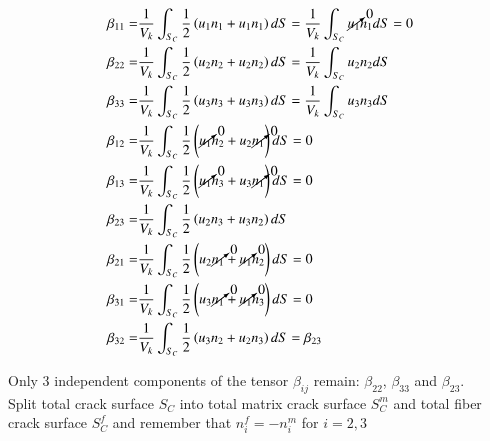 \documentclass[review]{elsarticle}
\begin{document}
\begin{equation}
\begin{aligned}
\beta_{11}=&\frac{1}{V_{k}}\int_{S_{C}}\frac{1}{2}\left(u_{1}n_{1}+u_{1}n_{1}\right)dS=\frac{1}{V_{k}}\int_{S_{C}}\cancelto{0}{u_{1}}n_{1}dS=0\\
\beta_{22}=&\frac{1}{V_{k}}\int_{S_{C}}\frac{1}{2}\left(u_{2}n_{2}+u_{2}n_{2}\right)dS=\frac{1}{V_{k}}\int_{S_{C}}u_{2}n_{2}dS\\
\beta_{33}=&\frac{1}{V_{k}}\int_{S_{C}}\frac{1}{2}\left(u_{3}n_{3}+u_{3}n_{3}\right)dS=\frac{1}{V_{k}}\int_{S_{C}}u_{3}n_{3}dS\\
\beta_{12}=&\frac{1}{V_{k}}\int_{S_{C}}\frac{1}{2}\left(\cancelto{0}{u_{1}}n_{2}+u_{2}\cancelto{0}{n_{1}}\right)dS=0\\
\beta_{13}=&\frac{1}{V_{k}}\int_{S_{C}}\frac{1}{2}\left(\cancelto{0}{u_{1}}n_{3}+u_{3}\cancelto{0}{n_{1}}\right)dS=0\\
\beta_{23}=&\frac{1}{V_{k}}\int_{S_{C}}\frac{1}{2}\left(u_{2}n_{3}+u_{3}n_{2}\right)dS\\
\beta_{21}=&\frac{1}{V_{k}}\int_{S_{C}}\frac{1}{2}\left(u_{2}\cancelto{0}{n_{1}}+\cancelto{0}{u_{1}}n_{2}\right)dS=0\\
\beta_{31}=&\frac{1}{V_{k}}\int_{S_{C}}\frac{1}{2}\left(u_{3}\cancelto{0}{n_{1}}+\cancelto{0}{u_{1}}n_{3}\right)dS=0\\
\beta_{32}=&\frac{1}{V_{k}}\int_{S_{C}}\frac{1}{2}\left(u_{3}n_{2}+u_{2}n_{3}\right)dS=\beta_{23}\\
\end{aligned}
\end{equation}

Only 3 independent components of the tensor $\beta_{ij}$ remain: $\beta_{22}$, $\beta_{33}$ and $\beta_{23}$.\\
Split total crack surface $S_{C}$ into total matrix crack surface $S_{C}^{m}$ and total fiber crack surface $S_{C}^{f}$ and remember that $n_{i}^{f}=-n_{i}^{m}$ for $i=2,3$
\end{document}
